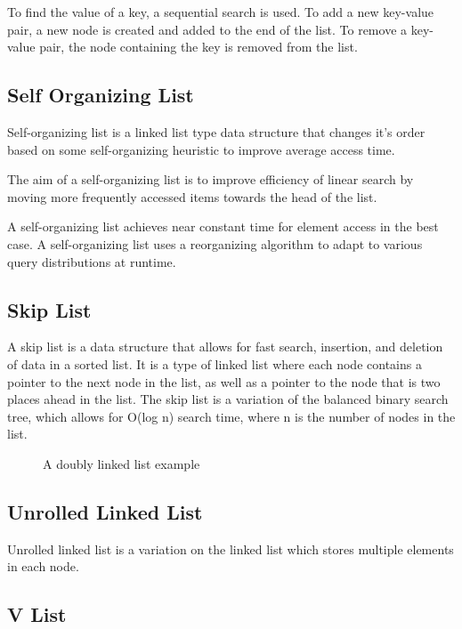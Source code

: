 \documentclass{book}
\begin{document}
    \noindent To find the value of a key, a sequential search is used. To add a new key-value pair, a new node is created and added to the end of the list. To remove a key-value pair, the node containing the key is removed from the list.

\subsection{Self Organizing List}

    Self-organizing list is a linked list type data structure that changes it's order based on some self-organizing heuristic to improve average access time. 

    \noindent The aim of a self-organizing list is to improve efficiency of linear search by moving more frequently accessed items towards the head of the list.
    
    \noindent A self-organizing list achieves near constant time for element access in the best case. A self-organizing list uses a reorganizing algorithm to adapt to various query distributions at runtime.

\subsection{Skip List}

    A skip list is a data structure that allows for fast search, insertion, and deletion of data in a sorted list. It is a type of linked list where each node contains a pointer to the next node in the list, as well as a pointer to the node that is two places ahead in the list. The skip list is a variation of the balanced binary search tree, which allows for O(log n) search time, where n is the number of nodes in the list.
    
\begin{figure}[htbp]
    \centering
    
    \caption{A doubly linked list example}
    \label{fig:skip_list}
\end{figure}

\subsection{Unrolled Linked List}

    Unrolled linked list is a variation on the linked list which stores multiple elements in each node. 

\subsection{V List}
\end{document}
